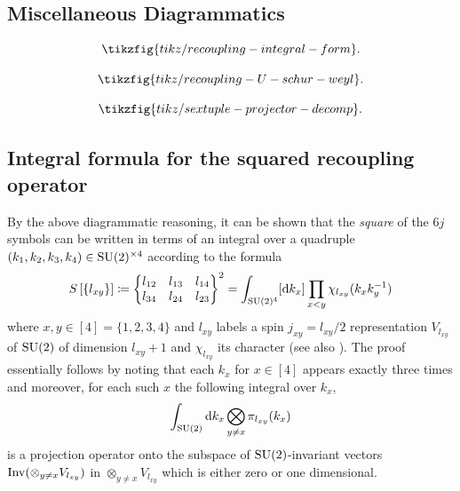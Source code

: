 \documentclass[notitlepage]{article}
\begin{document}
\subsection{Miscellaneous Diagrammatics}

\begin{equation}
    \tikzfig{tikz/recoupling-integral-form}.
\end{equation}

\begin{equation}
    \tikzfig{tikz/recoupling-U-schur-weyl}.
\end{equation}

\begin{equation}
    \tikzfig{tikz/sextuple-projector-decomp}.
\end{equation}

\subsection{Integral formula for the squared recoupling operator}

By the above diagrammatic reasoning, it can be shown that the \textit{square} of the $6j$ symbols can be written in terms of an integral over a quadruple $(k_1, k_2, k_3, k_4) \in \operatorname{SU}(2)^{\times 4}$ according to the formula
\begin{equation}
    S\left[ \{l_{xy}\} \right] \coloneqq
    \begin{Bmatrix}
        l_{12} & l_{13} & l_{14} \\
        l_{34} & l_{24} & l_{23}
    \end{Bmatrix}^2
    = \int_{\operatorname{SU}(2)^{4}} [\mathrm{d} k_x] \prod_{x < y} \chi_{l_{xy}}(k_x k_y^{-1})
\end{equation}
where $x,y \in [4] = \{1,2,3,4\}$ and $l_{xy}$ labels a spin $j_{xy} = l_{xy}/2$ representation $V_{l_{xy}}$ of $\operatorname{SU}(2)$ of dimension $l_{xy} + 1$ and $\chi_{l_{xy}}$ its character (see also \cite[Equation (1)]{freidel2003asymptotics}).
The proof essentially follows by noting that each $k_x$ for $x \in [4]$ appears exactly three times and moreover, for each such $x$ the following integral over $k_x$, 
\begin{equation}
    \int_{\operatorname{SU}(2)} \mathrm{d} k_x \bigotimes_{y \neq x} \pi_{l_{xy}}(k_x)
\end{equation}
is a projection operator onto the subspace of $\operatorname{SU}(2)$-invariant vectors $\operatorname{Inv}(\otimes_{y \neq x} V_{l_{xy}})$ in $\otimes_{y \neq x} V_{l_{xy}}$ which is either zero or one dimensional. 
\end{document}
